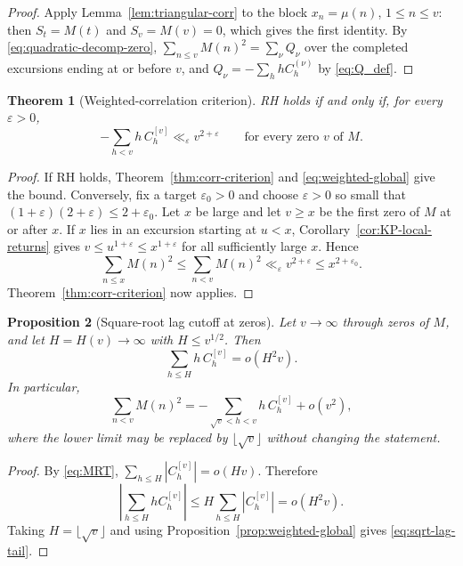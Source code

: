 \documentclass[11pt]{amsart}
\numberwithin{equation}{section}
\theoremstyle{plain}
\newtheorem{theorem}{Theorem}[section]
\newtheorem{proposition}[theorem]{Proposition}
\theoremstyle{definition}
\theoremstyle{remark}
\newcommand{\eps}{\varepsilon}
\begin{document}
\begin{proof}
Apply Lemma~\ref{lem:triangular-corr} to the block $x_n=\mu(n)$,
$1\le n\le v$: then $S_t=M(t)$ and $S_v=M(v)=0$, which gives the first
identity. By \eqref{eq:quadratic-decomp-zero}, $\sum_{n\le v}M(n)^2=\sum_\nu
Q_\nu$ over the completed excursions ending at or before $v$, and
$Q_\nu=-\sum_hhC^{(\nu)}_h$ by \eqref{eq:Q_def}.
\end{proof}

\begin{theorem}[Weighted-correlation criterion]
\label{thm:weighted-corr-RH}
RH holds if and only if, for every $\eps>0$,
\[
-\sum_{h<v}h\,C^{[v]}_h\ll_\eps v^{2+\eps}
\qquad\text{for every zero $v$ of $M$.}
\]
\end{theorem}

\begin{proof}
If RH holds, Theorem~\ref{thm:corr-criterion} and
\eqref{eq:weighted-global} give the bound. Conversely, fix a target
$\eps_0>0$ and choose $\eps>0$ so small that
$(1+\eps)(2+\eps)\le2+\eps_0$. Let $x$ be large and let $v\ge x$ be the
first zero of $M$ at or after $x$. If $x$ lies in an excursion starting at
$u<x$, Corollary~\ref{cor:KP-local-returns} gives $v\le u^{1+\eps}\le
x^{1+\eps}$ for all sufficiently large $x$. Hence
\[
\sum_{n\le x}M(n)^2\le\sum_{n<v}M(n)^2
\ll_\eps v^{2+\eps}\le x^{2+\eps_0}.
\]
Theorem~\ref{thm:corr-criterion} now applies.
\end{proof}

\begin{proposition}[Square-root lag cutoff at zeros]
\label{prop:sqrt-lag-cutoff}
Let $v\to\infty$ through zeros of $M$, and let $H=H(v)\to\infty$ with
$H\le v^{1/2}$. Then
\begin{equation}
\label{eq:small-lag-weighted}
\sum_{h\le H}h\,C_h^{[v]}=o(H^2v).
\end{equation}
In particular,
\begin{equation}
\label{eq:sqrt-lag-tail}
\sum_{n<v}M(n)^2
=-\sum_{\sqrt v<h<v}h\,C_h^{[v]}+o(v^2),
\end{equation}
where the lower limit may be replaced by $\lfloor\sqrt v\rfloor$ without
changing the statement.
\end{proposition}

\begin{proof}
By \eqref{eq:MRT},
$\sum_{h\le H}|C_h^{[v]}|=o(Hv)$. Therefore
\[
\left|\sum_{h\le H}hC_h^{[v]}\right|
\le H\sum_{h\le H}|C_h^{[v]}|=o(H^2v).
\]
Taking $H=\lfloor\sqrt v\rfloor$ and using
Proposition~\ref{prop:weighted-global} gives \eqref{eq:sqrt-lag-tail}.
\end{proof}
\end{document}
